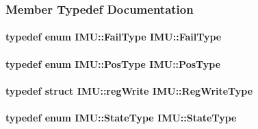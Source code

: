 \subsubsection{Member Typedef Documentation}
\hypertarget{class_i_m_u_a4baf4d6e504dcb71c4afab34be225620}{
\paragraph[{FailType}]{\setlength{\rightskip}{0pt plus 5cm}typedef enum {\bf IMU::FailType}  {\bf IMU::FailType}}\hfill}
\label{class_i_m_u_a4baf4d6e504dcb71c4afab34be225620}
\hypertarget{class_i_m_u_ad82ee88c050235081f004f81a5724e09}{
\paragraph[{PosType}]{\setlength{\rightskip}{0pt plus 5cm}typedef enum {\bf IMU::PosType}  {\bf IMU::PosType}}\hfill}
\label{class_i_m_u_ad82ee88c050235081f004f81a5724e09}
\hypertarget{class_i_m_u_a1960eeaec92b6b60d4f6c9e28b042b80}{
\paragraph[{RegWriteType}]{\setlength{\rightskip}{0pt plus 5cm}typedef struct {\bf IMU::regWrite}  {\bf IMU::RegWriteType}}\hfill}
\label{class_i_m_u_a1960eeaec92b6b60d4f6c9e28b042b80}
\hypertarget{class_i_m_u_a2c1f560a0bc80d0bd06bb56a614aeedd}{
\paragraph[{StateType}]{\setlength{\rightskip}{0pt plus 5cm}typedef enum {\bf IMU::StateType}  {\bf IMU::StateType}}\hfill}
\label{class_i_m_u_a2c1f560a0bc80d0bd06bb56a614aeedd}


